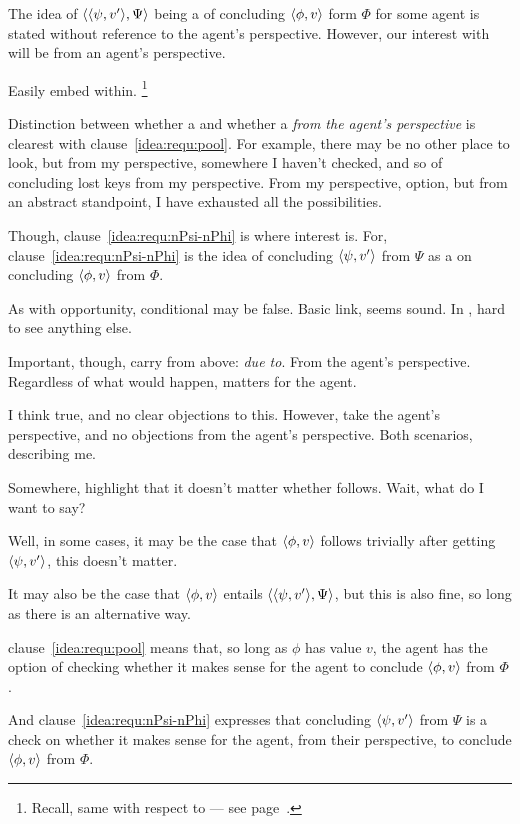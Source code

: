 \begin{note}
  The idea of \(\langle \langle \psi, v' \rangle, \Psi \rangle\) being a  of concluding \(\langle \phi, v \rangle\) form \(\Phi\) for some agent is stated without reference to the agent's perspective.
  However, our interest with  will be from an agent's perspective.

  Easily embed within.%
  \footnote{
    Recall, same with respect to  --- see page~\pageref{fcs-neutral-perspective}.
  }

  Distinction between whether a \requ{} and whether a \requ{} \emph{from the agent's perspective} is clearest with clause~\ref{idea:requ:pool}.
  For example, there may be no other place to look, but from my perspective, somewhere I haven't checked, and so \requ{} of concluding lost keys from my perspective.
  From my perspective, option, but from an abstract standpoint, I have exhausted all the possibilities.

  Though, clause~\ref{idea:requ:nPsi-nPhi} is where interest is.
  For, clause~\ref{idea:requ:nPsi-nPhi} is the idea of concluding \(\langle \psi, v' \rangle\) from \(\Psi\) as a \emph{} on concluding \(\langle \phi, v \rangle\) from \(\Phi\).

  As with opportunity, conditional may be false.
  Basic link, seems sound.
  In , hard to see anything else.

  Important, though, carry from above: \emph{due to}.
  From the agent's perspective.
  Regardless of what would happen, matters for the agent.

  I think true, and no clear objections to this.
  However, take the agent's perspective, and no objections from the agent's perspective.
  Both scenarios, describing me.
\end{note}

\begin{note}
  \color{red}
  Somewhere, highlight that it doesn't matter whether \requ{} follows.
  Wait, what do I want to say?

  Well, in some cases, it may be the case that \(\langle \phi, v \rangle\) follows trivially after getting \(\langle \psi, v' \rangle\), this doesn't matter.

  It may also be the case that \(\langle \phi, v \rangle\) entails \(\langle \langle \psi, v' \rangle, \Psi \rangle\), but this is also fine, so long as there is an alternative way.
\end{note}

\begin{note}
  \color{red}

  clause~\ref{idea:requ:pool} means that, so long as \(\phi\) has value \(v\), the agent has the option of checking whether it makes sense for the agent to conclude \(\langle \phi, v \rangle\) from \(\Phi\).

  And clause~\ref{idea:requ:nPsi-nPhi} expresses that concluding \(\langle \psi, v' \rangle\) from \(\Psi\) is a check on whether it makes sense for the agent, from their perspective, to conclude \(\langle \phi, v \rangle\) from \(\Phi\).
\end{note}

